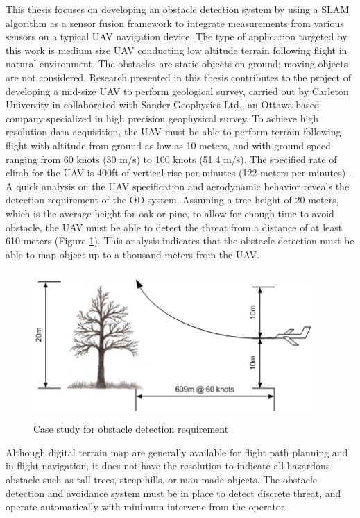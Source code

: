 This thesis focuses on developing an obstacle detection system by
using a SLAM algorithm as a sensor fusion framework to integrate measurements from various sensors on a typical UAV navigation device. The type of application targeted by this work is medium size
UAV conducting low altitude terrain following flight in natural
environment. The obstacles are static objects on ground; moving
objects are not considered. Research presented in this thesis
contributes to the project of developing a mid-size UAV to perform
geological survey, carried out by Carleton University in collaborated
with Sander Geophysics Ltd., an Ottawa based company specialized in
high precision geophysical survey. To achieve high resolution data
acquisition, the UAV must be able to perform terrain following flight
with altitude from ground as low as 10 meters, and with ground speed ranging from 60
knots (30 m/s) to 100 knots (51.4 m/s). The specified rate of climb for the UAV
is 400ft of vertical rise per minutes (122 meters per
minutes) \cite{james_geosurv_2008}. A quick analysis on the UAV
specification and aerodynamic behavior reveals the detection requirement of the OD system. Assuming a tree height of 20
meters, which is the average height for oak or pine, to allow for
enough time to avoid obstacle, the UAV must be able to detect the
threat from a distance of at least 610 meters (Figure \ref{ob}). This
analysis indicates that the obstacle detection must be able to map
object up to a thousand meters from the UAV.

\begin{figure}[h]
\centering
\includegraphics[width=300pt,height=160pt]{./Figures/ProblemStatement.png}
\caption {Case study for obstacle detection requirement}
\label{ob}
\end{figure}

Although digital terrain map are generally available for flight path 
planning and in flight navigation, it does not have the resolution to 
indicate all hazardous obstacle such as tall trees, steep hills, or 
man-made objects. The obstacle detection and avoidance system must 
be in place to detect discrete threat, and operate automatically with 
minimum intervene from the operator. 


